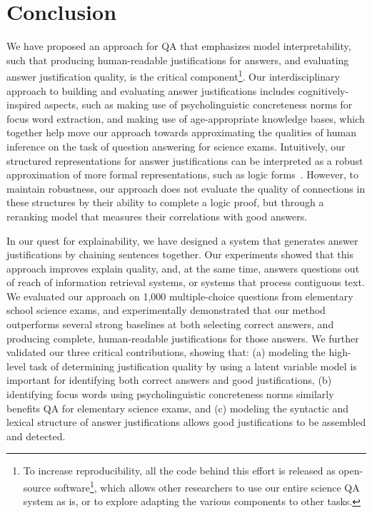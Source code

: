 \section{Conclusion}
\label{sec-cl2017:conclusion}

We have proposed an approach for QA that emphasizes model interpretability, such that producing human-readable justifications for answers, and evaluating answer justification quality, is the critical component\footnote{To increase reproducibility, all the code behind this effort is released as open-source software\footnote{\url{https://github.com/clulab/releases/tree/master/cl2017-qa}}, which allows other researchers to use our entire science QA system as is, or to explore adapting the various components to other tasks. }.
Our interdisciplinary approach to building and evaluating answer justifications includes cognitively-inspired aspects, such as making use of psycholinguistic concreteness norms for focus word extraction, and making use of age-appropriate knowledge bases, which together help move our approach towards approximating the qualities of human inference on the task of question answering for science exams. Intuitively, our structured representations for answer justifications can be interpreted as a robust approximation of more formal representations, such as logic forms~\citep{moldovan2001logic}. However, to maintain robustness, our approach does not evaluate the quality of connections in these structures by their ability to complete a logic proof, but through a reranking model that measures their correlations with good answers.

In our quest for explainability, we have designed a system that generates answer justifications by chaining sentences together. Our experiments showed that this approach improves explain quality, and, at the same time, answers questions out of reach of information retrieval systems, or systems that process contiguous text.  
We evaluated our approach on 1,000 multiple-choice questions from elementary school science exams, and experimentally demonstrated that our method outperforms several strong baselines at both selecting correct answers, and producing complete, human-readable justifications for those answers.  We further validated our three critical contributions, showing that: (a) modeling the high-level task of determining justification quality by using a latent variable model is important for identifying both correct answers and good justifications, (b) identifying focus words using psycholinguistic concreteness norms similarly benefits QA for elementary science exams, and (c) modeling the syntactic and lexical structure of answer justifications allows good justifications to be assembled and detected. 

